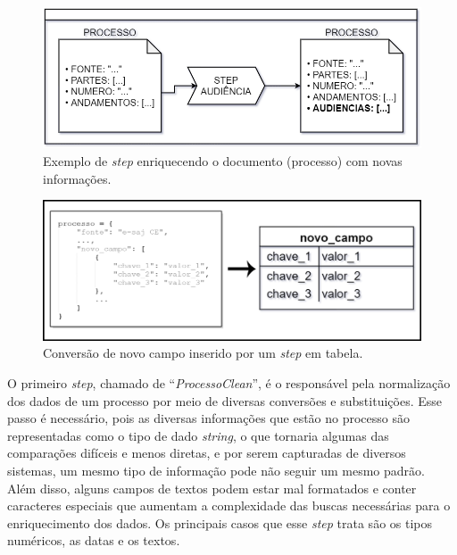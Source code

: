 \begin{figure}[ht]
\centering
\includegraphics[width=1\textwidth]{imagens/processo-in-step.png}
\caption{Exemplo de \textit{step} enriquecendo o documento (processo) com novas informações.}
\label{fig:processoInStep}
\end{figure}

\begin{figure}[ht]
\centering
\includegraphics[width=1\textwidth]{imagens/processo-para-tabela.png}
\caption{Conversão de novo campo inserido por um \textit{step} em tabela.}
\label{fig:processoParaTabela}
\end{figure}

O primeiro \textit{step}, chamado de \enquote{\textit{ProcessoClean}}, é o responsável pela normalização dos dados de um processo por meio de diversas conversões e substituições. Esse passo é necessário, pois as diversas informações que estão no processo são representadas como o tipo de dado \textit{string}, o que tornaria algumas das comparações difíceis e menos diretas, e por serem capturadas de diversos sistemas, um mesmo tipo de informação pode não seguir um mesmo padrão. Além disso, alguns campos de textos podem estar mal formatados e conter caracteres especiais que aumentam a complexidade das buscas necessárias para o enriquecimento dos dados. Os principais casos que esse \textit{step} trata são os tipos numéricos, as datas e os textos.

